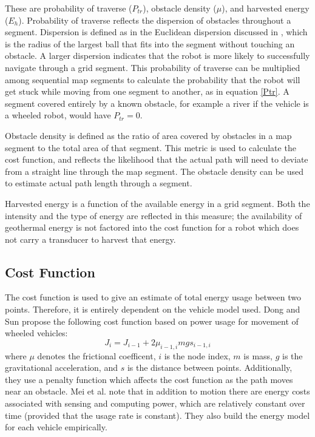 \documentclass[journal]{IEEEtran}
\begin{document}
These are probability of traverse ($P_{tr}$), obstacle density ($\mu$), and harvested energy ($E_h$). Probability of traverse reflects the dispersion of obstacles throughout a segment. 
Dispersion is defined as in the Euclidean dispersion discussed in \cite{LaValle Branicky Lindeman}, which is the radius of the largest ball that fits into the segment without touching an obstacle. 
A larger dispersion indicates that the robot is more likely to successfully navigate through a grid segment.
This probability of traverse can be multiplied among sequential map segments to calculate the probability that the robot will get stuck while moving from one segment to another, as in equation \ref{Ptr}. 
A segment covered entirely by a known obstacle, for example a river if the vehicle is a wheeled robot, would have $P_{tr} = 0$. 

Obstacle density is defined as the ratio of area covered by obstacles in a map segment to the total area of that segment. 
This metric is used to calculate the cost function, and reflects the likelihood that the actual path will need to deviate from a straight line through the map segment. 
The obstacle density can be used to estimate actual path length through a segment.

Harvested energy is a function of the available energy in a grid segment. Both the intensity and the type of energy are reflected in this measure; the availability of geothermal energy is not factored into the cost function for a robot which does not carry a transducer to harvest that energy.
 
\subsection{Cost Function}
The cost function is used to give an estimate of total energy usage between two points. 
Therefore, it is entirely dependent on the vehicle model used. Dong and Sun \cite{minimizing energy consumption of wheeled mobile robots ...} propose the following cost function based on power usage for movement of wheeled vehicles:
\begin{equation}
J_i = J_{i-1} + 2\mu_{i-1,i}mg s_{i-1,i}
\end{equation}
where $\mu$ denotes the frictional coefficent, $i$ is the node index, $m$ is mass, $g$ is the gravitational acceleration, and $s$ is the distance between points. 
Additionally, they use a penalty function which affects the cost function as the path moves near an obstacle.
Mei et al. \cite{Mei - deployment} note that in addition to motion there are energy costs associated with sensing and computing power, which are relatively constant over time (provided that the usage rate is constant).
They also build the energy model for each vehicle empirically.
\end{document}

